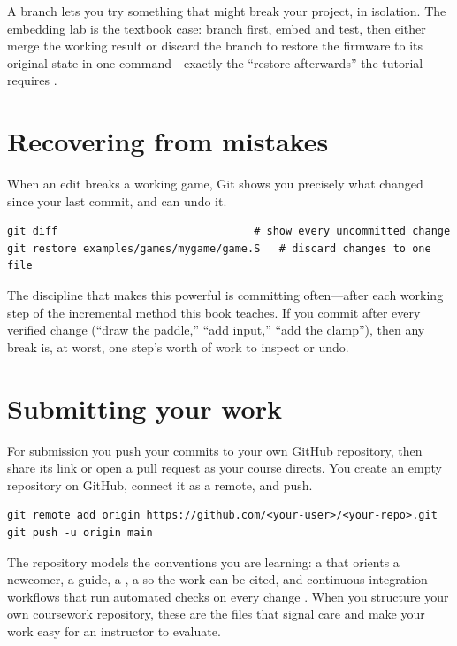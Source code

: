 \begin{prgconcept}
A branch lets you try something that might break your project, in isolation. The
embedding lab is the textbook case: branch first, embed and test, then either merge
the working result or discard the branch to restore the firmware to its original
state in one command---exactly the ``restore afterwards'' the tutorial requires
\citep{prg32tutorialc}.
\end{prgconcept}

\section{Recovering from mistakes}

When an edit breaks a working game, Git shows you precisely what changed since your
last commit, and can undo it.

\begin{lstlisting}[style=bash,caption={Seeing and undoing uncommitted changes.}]
git diff                               # show every uncommitted change
git restore examples/games/mygame/game.S   # discard changes to one file
\end{lstlisting}

The discipline that makes this powerful is committing often---after each working
step of the incremental method this book teaches. If you commit after every
verified change (``draw the paddle,'' ``add input,'' ``add the clamp''), then any
break is, at worst, one step's worth of work to inspect or undo.

\section{Submitting your work}

For submission you push your commits to your own GitHub repository, then share its
link or open a pull request as your course directs. You create an empty repository
on GitHub, connect it as a remote, and push.

\begin{lstlisting}[style=bash,caption={Publishing your work to your own GitHub repository.}]
git remote add origin https://github.com/<your-user>/<your-repo>.git
git push -u origin main
\end{lstlisting}

\begin{prgaside}
The \prg repository models the conventions you are learning: a  that
orients a newcomer, a  guide, a , a
 so the work can be cited, and continuous-integration workflows
that run automated checks on every change \citep{prg32repo}. When you structure your
own coursework repository, these are the files that signal care and make your work
easy for an instructor to evaluate.
\end{prgaside}

